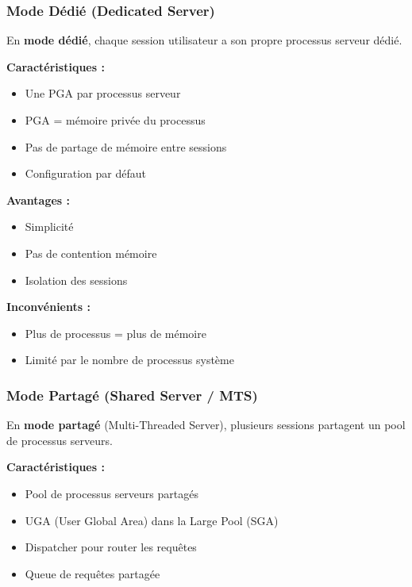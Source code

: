 \documentclass[11pt,a4paper]{article}
\begin{document}
\subsubsection{Mode Dédié (Dedicated Server)}

\begin{definitionbox}
En \textbf{mode dédié}, chaque session utilisateur a son propre processus serveur dédié.
\end{definitionbox}

\textbf{Caractéristiques :}
\begin{itemize}
    \item Une PGA par processus serveur
    \item PGA = mémoire privée du processus
    \item Pas de partage de mémoire entre sessions
    \item Configuration par défaut
\end{itemize}

\textbf{Avantages :}
\begin{itemize}
    \item Simplicité
    \item Pas de contention mémoire
    \item Isolation des sessions
\end{itemize}

\textbf{Inconvénients :}
\begin{itemize}
    \item Plus de processus = plus de mémoire
    \item Limité par le nombre de processus système
\end{itemize}

\subsubsection{Mode Partagé (Shared Server / MTS)}

\begin{definitionbox}
En \textbf{mode partagé} (Multi-Threaded Server), plusieurs sessions partagent un pool de processus serveurs.
\end{definitionbox}

\textbf{Caractéristiques :}
\begin{itemize}
    \item Pool de processus serveurs partagés
    \item UGA (User Global Area) dans la Large Pool (SGA)
    \item Dispatcher pour router les requêtes
    \item Queue de requêtes partagée
\end{itemize}
\end{document}
